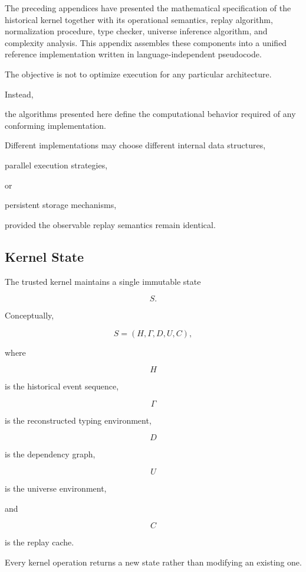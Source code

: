 \documentclass[12pt,oneside]{article}
\theoremstyle{definition}
\theoremstyle{remark}
\begin{document}
The preceding appendices have presented the mathematical specification of the
historical kernel together with its operational semantics, replay algorithm,
normalization procedure, type checker, universe inference algorithm, and
complexity analysis. This appendix assembles these components into a unified
reference implementation written in language-independent pseudocode.

The objective is not to optimize execution for any particular architecture.

Instead,

the algorithms presented here define the computational behavior required of any
conforming implementation.

Different implementations may choose different internal data structures,

parallel execution strategies,

or

persistent storage mechanisms,

provided the observable replay semantics remain identical.


\subsection{Kernel State}

The trusted kernel maintains a single immutable state

\[
S.
\]

Conceptually,

\[
S
=
(H,\Gamma,D,U,C),
\]

where

\[
H
\]

is the historical event sequence,

\[
\Gamma
\]

is the reconstructed typing environment,

\[
D
\]

is the dependency graph,

\[
U
\]

is the universe environment,

and

\[
C
\]

is the replay cache.

Every kernel operation returns a new state rather than modifying an existing
one.

\end{document}
